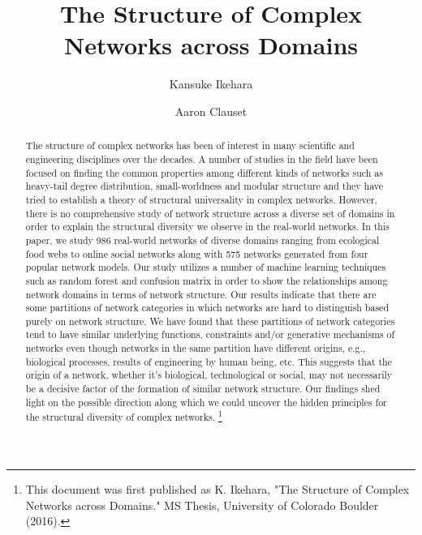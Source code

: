 \documentclass[%
 reprint,
 amsmath,amssymb,
 aps,
superscriptaddress,
]{revtex4-1}
\begin{document}

\title{The Structure of Complex Networks across Domains}%

\author{Kansuke Ikehara}

 
\author{Aaron Clauset}

 

\begin{abstract}
The structure of complex networks has been of interest in many scientific and engineering disciplines over the decades. A number of studies in the field have been focused on finding the common properties among different kinds of networks such as heavy-tail degree distribution, small-worldness and modular structure and they have tried to establish a theory of structural universality in complex networks. However, there is no comprehensive study of network structure across a diverse set of domains in order to explain the structural diversity we observe in the real-world networks. In this paper, we study 986 real-world networks of diverse domains ranging from ecological food webs to online social networks along with 575 networks generated from four popular network models. Our study utilizes a number of  machine learning techniques such as random forest and confusion matrix in order to show the relationships among network domains in terms of network structure. Our results indicate that there are some partitions of network categories in which networks are hard to distinguish based purely on network structure. We have found that these partitions of network categories tend to have similar underlying functions, constraints and/or generative mechanisms of networks even though networks in the same partition have different origins, e.g., biological processes, results of engineering by human being, etc. This suggests that the origin of a network, whether it's biological, technological or social, may not necessarily be a decisive factor of the formation of similar network structure. Our findings shed light on the possible direction along which we could uncover the hidden principles for the structural diversity of complex networks.
\footnote{This document was first published as K. Ikehara, "The Structure of Complex Networks across Domains." MS Thesis, University of Colorado Boulder (2016).}
\end{abstract}
\end{document}

